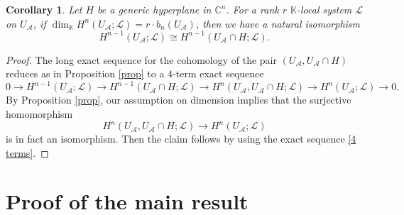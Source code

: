 \documentclass[12pt,leqno,twoside]{amsart}
\theoremstyle{plain}
\newtheorem{cor}[theorem]{Corollary}
\theoremstyle{definition}
\newcommand{\C}{\mathbb{C}}
\newcommand{\K}{\mathbb{K}}
\newcommand{\sA}{\mathcal{A}}
\newcommand{\sL}{\mathcal{L}}
\begin{document}
\begin{cor} 
Let $H$ be a generic hyperplane in $\C^n$. For a rank $r$ $\K$-local system $\sL$ on $U_\sA$, if 
  $ \dim_\K H^n(U_\sA; \sL)=r\cdot b_n(U_\sA)$,
    then we have a natural isomorphism
    \begin{equation}\label{eq_44}
H^{n-1}(U_\sA; \sL)\cong H^{n-1}(U_\sA\cap H; \sL).
\end{equation}
\end{cor}
\begin{proof}
  The long exact sequence for the cohomology of the pair $(U_\sA, U_\sA \cap H)$ reduces as in 
Proposition \ref{prop} to a $4$-term exact sequence 
\begin{equation} \label{4 terms}
    0 \to H^{n-1}(U_\sA; \sL)\to H^{n-1}(U_\sA\cap H; \sL)\to  H^{n}(U_\sA, U_\sA\cap H; \sL)\to H^{n}(U_\sA; \sL) \to 0.
\end{equation}
By Proposition \ref{prop}, our assumption on dimension implies that the surjective homomorphism 
\[
H^{n}(U_\sA, U_\sA\cap H; \sL)\to H^{n}(U_\sA; \sL)
\]
is in fact an isomorphism. 
Then the claim follows by using the exact sequence \eqref{4 terms}.
\end{proof}



\section{Proof of the main result}
\end{document}
